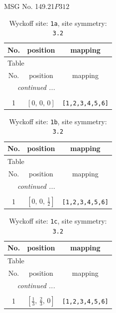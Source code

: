 \documentclass[fleqn,8pt]{jsarticle}
\begin{document}
\setcounter{MaxMatrixCols}{32}

\renewcommand{\tablename}{Table~}
\renewcommand{\figurename}{Figure~}
\begin{center}
\LARGE
MSG No. 149.21\quad$P312$
\end{center}
\renewcommand{\arraystretch}{1.2}
\begin{longtable}{ccc}
\caption{Wyckoff site: {\tt 1a}, site symmetry: {\tt 3.2}}
 \\
 \hline \hline
No. & position & mapping \\ \hline \endfirsthead

\multicolumn{2}{l}{\tablename\ \thetable{}} \\
 \hline \hline
No. & position & mapping \\ \hline \endhead

 \hline \hline
\multicolumn{2}{r}{\footnotesize\it continued ...} \\ \endfoot

 \hline \hline
\multicolumn{2}{r}{} \\ \endlastfoot

1 & $\left[ 0,\, 0,\, 0 \right]$ & {\tt [1,2,3,4,5,6]} \\
\end{longtable}
\renewcommand{\arraystretch}{1.2}
\begin{longtable}{ccc}
\caption{Wyckoff site: {\tt 1b}, site symmetry: {\tt 3.2}}
 \\
 \hline \hline
No. & position & mapping \\ \hline \endfirsthead

\multicolumn{2}{l}{\tablename\ \thetable{}} \\
 \hline \hline
No. & position & mapping \\ \hline \endhead

 \hline \hline
\multicolumn{2}{r}{\footnotesize\it continued ...} \\ \endfoot

 \hline \hline
\multicolumn{2}{r}{} \\ \endlastfoot

1 & $\left[ 0,\, 0,\, \frac{1}{2} \right]$ & {\tt [1,2,3,4,5,6]} \\
\end{longtable}
\renewcommand{\arraystretch}{1.2}
\begin{longtable}{ccc}
\caption{Wyckoff site: {\tt 1c}, site symmetry: {\tt 3.2}}
 \\
 \hline \hline
No. & position & mapping \\ \hline \endfirsthead

\multicolumn{2}{l}{\tablename\ \thetable{}} \\
 \hline \hline
No. & position & mapping \\ \hline \endhead

 \hline \hline
\multicolumn{2}{r}{\footnotesize\it continued ...} \\ \endfoot

 \hline \hline
\multicolumn{2}{r}{} \\ \endlastfoot

1 & $\left[ \frac{1}{3},\, \frac{2}{3},\, 0 \right]$ & {\tt [1,2,3,4,5,6]} \\
\end{longtable}
\end{document}
